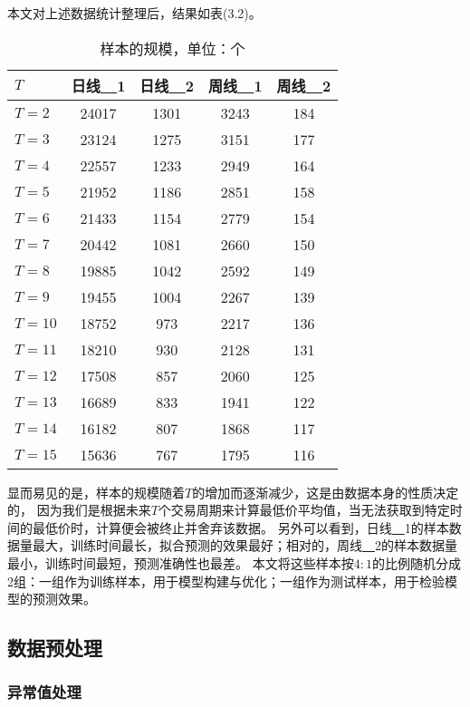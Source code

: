 本文对上述数据统计整理后，结果如表(3.2)。
\begin{table}[ht]
    \centering
    \caption{样本的规模，单位：个}
    \begin{tabular}{lcccc}
        \hline
        {$T$} & {日线\underline{~~}1} & {日线\underline{~~}2} & {周线\underline{~~}1} & {周线\underline{~~}2}\\
        \hline
        {$T=2$} & {24017} & {1301} & {3243} & {184}\\
        {$T=3$} & {23124} & {1275} & {3151} & {177}\\
        {$T=4$} & {22557} & {1233} & {2949} & {164}\\
        {$T=5$} & {21952} & {1186} & {2851} & {158}\\
        {$T=6$} & {21433} & {1154} & {2779} & {154}\\
        {$T=7$} & {20442} & {1081} & {2660} & {150}\\
        {$T=8$} & {19885} & {1042} & {2592} & {149}\\
        {$T=9$} & {19455} & {1004} & {2267} & {139}\\
        {$T=10$} & {18752} & {973} & {2217} & {136}\\
        {$T=11$} & {18210} & {930} & {2128} & {131}\\
        {$T=12$} & {17508} & {857} & {2060} & {125}\\
        {$T=13$} & {16689} & {833} & {1941} & {122}\\
        {$T=14$} & {16182} & {807} & {1868} & {117}\\
        {$T=15$} & {15636} & {767} & {1795} & {116}\\
        \hline
    \end{tabular}
\end{table}
显而易见的是，样本的规模随着$T$的增加而逐渐减少，这是由数据本身的性质决定的，
因为我们是根据未来$T$个交易周期来计算最低价平均值，当无法获取到特定时间的最低价时，计算便会被终止并舍弃该数据。
另外可以看到，日线\underline{~~}1的样本数据量最大，训练时间最长，拟合预测的效果最好；相对的，周线\underline{~~}2的样本数据量最小，训练时间最短，预测准确性也最差。
本文将这些样本按$4:1$的比例随机分成2组：一组作为训练样本，用于模型构建与优化；一组作为测试样本，用于检验模型的预测效果。

\subsection{数据预处理}

\subsubsection{异常值处理}

